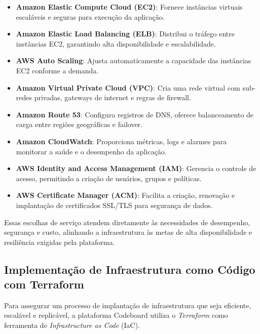 \begin{itemize}
    \item \textbf{Amazon Elastic Compute Cloud (EC2)}: Fornece instâncias virtuais escaláveis e seguras para execução da aplicação.
    \item \textbf{Amazon Elastic Load Balancing (ELB)}: Distribui o tráfego entre instâncias EC2, garantindo alta disponibilidade e escalabilidade.
    \item \textbf{AWS Auto Scaling}: Ajusta automaticamente a capacidade das instâncias EC2 conforme a demanda.
    \item \textbf{Amazon Virtual Private Cloud (VPC)}: Cria uma rede virtual com sub-redes privadas, gateways de internet e regras de firewall.
    \item \textbf{Amazon Route 53}: Configura registros de DNS, oferece balanceamento de carga entre regiões geográficas e failover.
    \item \textbf{Amazon CloudWatch}: Proporciona métricas, logs e alarmes para monitorar a saúde e o desempenho da aplicação.
    \item \textbf{AWS Identity and Access Management (IAM)}: Gerencia o controle de acesso, permitindo a criação de usuários, grupos e políticas.
    \item \textbf{AWS Certificate Manager (ACM)}: Facilita a criação, renovação e implantação de certificados SSL/TLS para segurança de dados.
\end{itemize}

Essas escolhas de serviço atendem diretamente às necessidades de desempenho, segurança e custo, alinhando a infraestrutura às metas de alta disponibilidade e resiliência exigidas pela plataforma.


\subsection{Implementação de Infraestrutura como Código com Terraform}

Para assegurar um processo de implantação de infraestrutura que seja eficiente, escalável e replicável, a plataforma Codeboard utiliza o \emph{Terraform} como ferramenta de \emph{Infrastructure as Code} (IaC).

